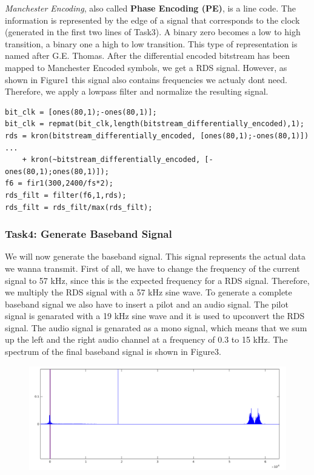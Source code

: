 \documentclass[sigconf]{acmart}
\begin{document}
\emph{Manchester Encoding}, also called
\protect\hypertarget{Phaseux20Encodingux20ux28PEux29}{}{}\textbf{Phase
Encoding (PE)}, is a line code. The information is represented by the
edge of a signal that corresponds to the clock (generated in the first
two lines of Task3). A binary zero becomes a low to high transition, a
binary one a high to low transition. This type of representation is
named after G.E. Thomas. After the differential encoded bitstream has
been mapped to Manchester Encoded symbols, we get a RDS signal. However,
as shown in Figure1 this signal also contains frequencies we actualy
dont need. Therefore, we apply a lowpass filter and normalize the
resulting signal.

\begin{verbatim}
bit_clk = [ones(80,1);-ones(80,1)];
bit_clk = repmat(bit_clk,length(bitstream_differentially_encoded),1);
rds = kron(bitstream_differentially_encoded, [ones(80,1);-ones(80,1)]) ...
    + kron(~bitstream_differentially_encoded, [-ones(80,1);ones(80,1)]);
f6 = fir1(300,2400/fs*2);
rds_filt = filter(f6,1,rds);
rds_filt = rds_filt/max(rds_filt);
\end{verbatim}

\hypertarget{Task4:ux20Generateux20Basebandux20Signal}{%
\subsubsection{Task4: Generate Baseband
Signal}\label{Task4:ux20Generateux20Basebandux20Signal}}

We will now generate the baseband signal. This signal represents the
actual data we wanna transmit. First of all, we have to change the
frequency of the current signal to 57 kHz, since this is the expected
frequency for a RDS signal. Therefore, we multiply the RDS signal with a
57 kHz sine wave. To generate a complete baseband signal we also have to
insert a pilot and an audio signal. The pilot signal is genarated with a
19 kHz sine wave and it is used to upconvert the RDS signal. The audio
signal is genarated as a mono signal, which means that we sum up the
left and the right audio channel at a frequency of 0.3 to 15 kHz. The
spectrum of the final baseband signal is shown in Figure3.

\begin{figure}[tb!]
	\includegraphics[width=1\linewidth]{baseband_spectrum2.png}
	\caption{}
	\label{fig:rds_filt_plot}
\end{figure}
\end{document}

